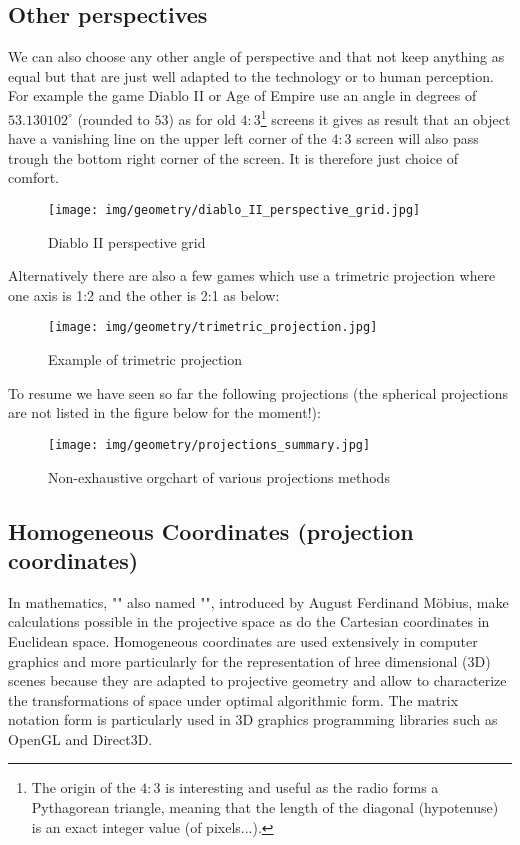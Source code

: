 	\subsection{Other perspectives}
	We can also choose any other angle of perspective and that not keep anything as equal but that are just well adapted to the technology or to human perception. For example the game Diablo II or Age of Empire use an angle in degrees of $53.130102^\circ$ (rounded to $53$) as for old $4:3$\footnote{The origin of the $4:3$ is interesting and useful as the radio forms a Pythagorean triangle, meaning that the length of the diagonal (hypotenuse) is an exact integer value (of pixels...).} screens it gives as result that an object have a vanishing line on the upper left corner of the $4:3$ screen will also pass trough the bottom right corner of the screen. It is therefore just choice of comfort.
	\begin{figure}[H]
		\centering
		\texttt{[image: img/geometry/diablo\_II\_perspective\_grid.jpg]}
		\caption[]{Diablo II perspective grid}
	\end{figure}
	Alternatively there are also a few games which use a trimetric projection where one axis is 1:2 and the other is 2:1 as below:
	\begin{figure}[H]
		\centering
		\texttt{[image: img/geometry/trimetric\_projection.jpg]}
		\caption[]{Example of trimetric projection}
	\end{figure}
	To resume we have seen so far the following projections (the spherical projections are not listed in the figure below for the moment!):
	\begin{figure}[H]
		\centering
		\texttt{[image: img/geometry/projections\_summary.jpg]}
		\caption{Non-exhaustive orgchart of various projections methods}
	\end{figure}
	
	\subsection{Homogeneous Coordinates (projection coordinates)}
	In mathematics, "\label{homogeneous coordinates}" also named "", introduced by August Ferdinand Möbius, make calculations possible in the projective space as do the Cartesian coordinates in Euclidean space. Homogeneous coordinates are used extensively in computer graphics and more particularly for the representation of hree dimensional (3D) scenes  because they are adapted to projective geometry and allow to characterize the transformations of space under optimal algorithmic form. The matrix notation form is particularly used in 3D graphics programming  libraries such as OpenGL and Direct3D.

